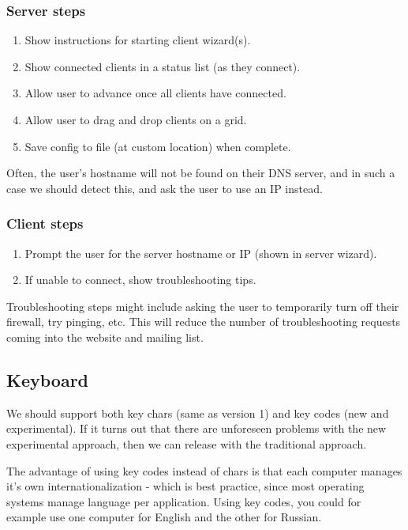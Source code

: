 \subsubsection{Server steps}
\begin{enumerate}
  \item Show instructions for starting client wizard(s).
  \item Show connected clients in a status list (as they connect).
  \item Allow user to advance once all clients have connected.
  \item Allow user to drag and drop clients on a grid.
  \item Save config to file (at custom location) when complete.
\end{enumerate}

Often, the user's hostname will not be found on their DNS server, and in such
a case we should detect this, and ask the user to use an IP instead.

\subsubsection{Client steps}
\begin{enumerate}
  \item Prompt the user for the server hostname or IP (shown in server wizard).
  \item If unable to connect, show troubleshooting tips.
\end{enumerate}

Troubleshooting steps might include asking the user to temporarily turn off
their firewall, try pinging, etc. This will reduce the number of troubleshooting
requests coming into the website and mailing list.

\subsection{Keyboard}

We should support both key chars (same as version 1) and key codes (new and
experimental). If it turns out that there are unforeseen problems with the
new experimental approach, then we can release with the traditional approach.

The advantage of using key codes instead of chars is that each computer manages
it's own internationalization - which is best practice, since most operating
systems manage language per application. Using key codes, you could for example 
use one computer for English and the other for Russian.

